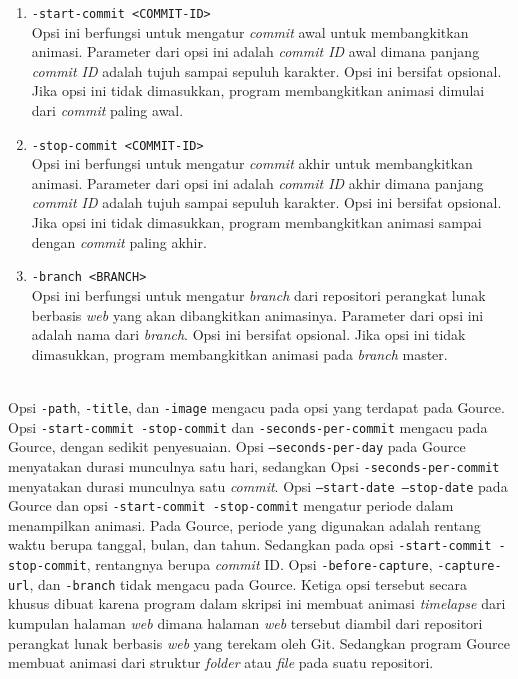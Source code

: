 \begin{enumerate}

\item \texttt{-start-commit <COMMIT-ID>}\\
Opsi ini berfungsi untuk mengatur \textit{commit} awal untuk membangkitkan animasi. Parameter dari opsi ini adalah \textit{commit ID} awal dimana panjang \textit{commit ID} adalah tujuh sampai sepuluh karakter. Opsi ini bersifat opsional. Jika opsi ini tidak dimasukkan, program membangkitkan animasi dimulai dari \textit{commit} paling awal.
\item \texttt{-stop-commit <COMMIT-ID>}\\
Opsi ini berfungsi untuk mengatur \textit{commit} akhir untuk membangkitkan animasi. Parameter dari opsi ini adalah \textit{commit ID} akhir dimana panjang \textit{commit ID} adalah tujuh sampai sepuluh karakter. Opsi ini bersifat opsional. Jika opsi ini tidak dimasukkan, program membangkitkan animasi sampai dengan \textit{commit} paling akhir.

\item \texttt{-branch <BRANCH>}\\
Opsi ini berfungsi untuk mengatur \textit{branch} dari repositori perangkat lunak berbasis \textit{web} yang akan dibangkitkan animasinya. Parameter dari opsi ini adalah nama dari \textit{branch}. Opsi ini bersifat opsional. Jika opsi ini tidak dimasukkan, program membangkitkan animasi pada \textit{branch} master.
\end{enumerate}
\ \\
Opsi \texttt{-path}, \texttt{-title}, dan \texttt{-image} mengacu pada opsi yang terdapat pada Gource. Opsi \texttt{-start-commit -stop-commit} dan \texttt{-seconds-per-commit} mengacu pada Gource, dengan sedikit penyesuaian.  Opsi \texttt{--seconds-per-day} pada Gource menyatakan durasi munculnya satu hari, sedangkan Opsi \texttt{-seconds-per-commit} menyatakan durasi munculnya satu \textit{commit}. Opsi \texttt{--start-date --stop-date} pada Gource dan opsi \texttt{-start-commit -stop-commit} mengatur periode dalam menampilkan animasi. Pada Gource, periode yang digunakan adalah rentang waktu berupa tanggal, bulan, dan tahun. Sedangkan pada opsi \texttt{-start-commit -stop-commit}, rentangnya berupa \textit{commit} ID. Opsi \texttt{-before-capture}, \texttt{-capture-url}, dan \texttt{-branch} tidak mengacu pada Gource. Ketiga opsi tersebut secara khusus dibuat karena program dalam skripsi ini membuat animasi \textit{timelapse} dari kumpulan halaman \textit{web} dimana halaman \textit{web} tersebut diambil dari repositori perangkat lunak berbasis \textit{web} yang terekam oleh Git. Sedangkan program Gource membuat animasi dari struktur \textit{folder} atau \textit{file} pada suatu repositori.            
  
